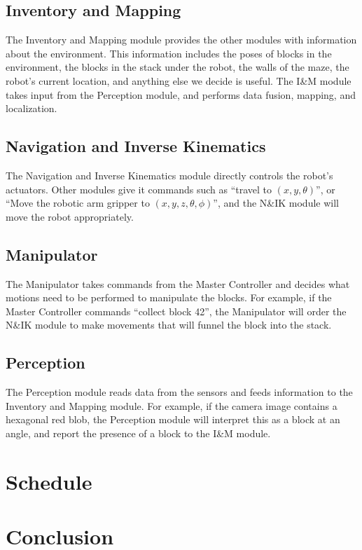 \documentclass[letterpaper,11pt]{article}
\begin{document}
\subsection{Inventory and Mapping}
The Inventory and Mapping module provides the other modules with information about the environment.
This information includes the poses of blocks in the environment,
the blocks in the stack under the robot,
the walls of the maze,
the robot's current location,
and anything else we decide is useful.
The I\&M module takes input from the Perception module, and performs data fusion, mapping, and localization.

\subsection{Navigation and Inverse Kinematics}
The Navigation and Inverse Kinematics module directly controls the robot's actuators.
Other modules give it commands such as ``travel to $(x, y, \theta)$'',
or ``Move the robotic arm gripper to $(x, y, z, \theta, \phi)$'',
and the N\&IK module will move the robot appropriately.

\subsection{Manipulator}
The Manipulator takes commands from the Master Controller
and decides what motions need to be performed to manipulate the blocks.
For example, if the Master Controller commands ``collect block 42'',
the Manipulator will order the N\&IK module to make movements that will funnel the block into the stack.

\subsection{Perception}
The Perception module reads data from the sensors and feeds information to the Inventory and Mapping module.
For example, if the camera image contains a hexagonal red blob,
the Perception module will interpret this as a block at an angle,
and report the presence of a block to the I\&M module.

\section{Schedule}

\section{Conclusion}
\end{document}
